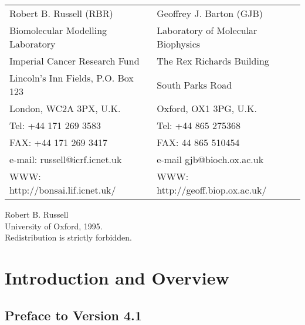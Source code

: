 \begin{titlepage}
\begin{tabular}{ll}
Robert B. Russell (RBR)		   & Geoffrey J. Barton (GJB)\\
Biomolecular Modelling Laboratory  & Laboratory of Molecular Biophysics\\
Imperial Cancer Research Fund      & The Rex Richards Building\\
Lincoln's Inn Fields, P.O. Box 123 & South Parks Road\\
London, WC2A 3PX, U.K.             & Oxford, OX1 3PG, U.K.\\
Tel: +44 171 269 3583              & Tel: +44 865 275368\\
FAX: +44 171 269 3417              & FAX: 44 865 510454\\
e-mail: russell@icrf.icnet.uk      & e-mail gjb@bioch.ox.ac.uk\\
WWW: http://bonsai.lif.icnet.uk/   & WWW: http://geoff.biop.ox.ac.uk/\\
\end{tabular}
\vskip 0.25in
\noindent
\begin{center}
Robert B. Russell\\
University of Oxford, 1995.\\
Redistribution is strictly forbidden.\\
\noindent

\end{center}

\end{titlepage}

\tableofcontents

\parindent 0in

\chapter{Introduction and Overview}

\section{Preface to Version 4.1}

